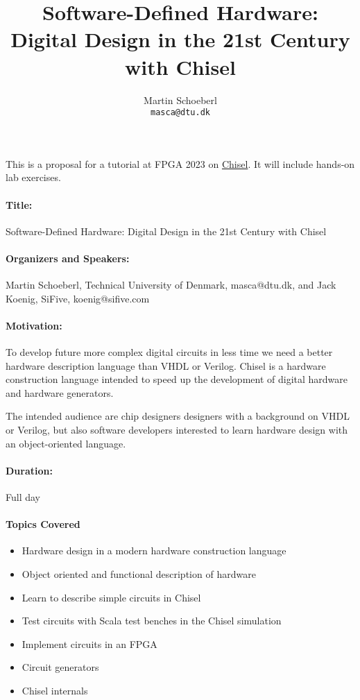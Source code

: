 \documentclass{article}
\begin{document}
\title{Software-Defined Hardware:\\ Digital Design in the 21st Century with Chisel}

\author{Martin Schoeberl\\
\texttt{masca@dtu.dk}}


\maketitle \thispagestyle{empty}

This is a proposal for a tutorial at FPGA 2023 on \href{https://chisel.eecs.berkeley.edu/}{Chisel}.
It will include hands-on lab exercises.


\paragraph{Title:} Software-Defined Hardware: Digital Design in the 21st Century with Chisel
\paragraph{Organizers and Speakers:} Martin Schoeberl, Technical University of Denmark, masca@dtu.dk, and
Jack Koenig, SiFive, koenig@sifive.com

\paragraph{Motivation:}

To develop future more complex digital circuits in less time we need a better hardware description
language than VHDL or Verilog. Chisel is a hardware construction language intended to
speed up the development of digital hardware and hardware generators.

The intended audience are chip designers designers with a background on VHDL or Verilog,
but also software developers interested to learn hardware design with an object-oriented language.
 
\paragraph{Duration:} Full day

\paragraph{Topics Covered}

\begin{itemize}
\item Hardware design in a modern hardware construction language
\item Object oriented and functional description of hardware
\item Learn to describe simple circuits in Chisel
\item Test circuits with Scala test benches in the Chisel simulation
\item Implement circuits in an FPGA
\item Circuit generators
\item Chisel internals
\end{itemize}
\end{document}
